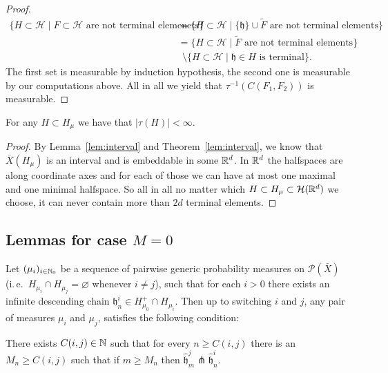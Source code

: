 \begin{proof}
  \begin{align*}
    \{H \subset \mathcal{H} \mid F \subset \mathcal{H} \text{ are not terminal elemenets}\}
    & = \{H \subset \mathcal{H} \mid \{\mathfrak{h}\} \cup \tilde F \text{ are not terminal elements}\}\\
    & = \{H \subset \mathcal{H} \mid \tilde{F} \text{ are not terminal elements}\} \\
    & \ \ \setminus \{H \subset \mathcal{H} \mid \mathfrak{h} \in H \text{ is terminal}\}.
  \end{align*}
  The first set is measurable by induction hypothesis, the second one is measurable by our computations above. All in all we yield that \(\tau^{-1}(C(F_1, F_2))\) is measurable.
\end{proof}

\begin{lemma}
  \label{lem:finite-terminal}
  For any \(H \subset H_\mu\) we have that \(|\tau(H)| < \infty\).
\end{lemma}

\begin{proof}
  By Lemma~\ref{lem:interval} and Theorem~\ref{lem:interval}, we know that \(\bar X(H_\mu)\) is an interval and is embeddable in some \(\mathbb{R}^d\). In \(\mathbb{R}^d\) the halfspaces are along coordinate axes and for each of those we can have at most one maximal and one minimal halfspace. So all in all no matter which \(H \subset H_\mu \subset \mathcal{H}(\mathbb{R}^d)\) we choose, it can never contain more than \(2d\) terminal elements.
\end{proof}

\subsection{Lemmas for case \(M=0\)}
\label{sec:M=0}

\begin{lemma}[{\cite[Lemma~4.13]{MR3509968}}]
  \label{lem:4.13}
  Let \((\mu_i)_{i \in \mathbb{N}_0}\) be a sequence of pairwise generic probability measures on \(\mathcal{P}(\bar X)\) (i.\,e.\ \(H_{\mu_i} \cap H_{\mu_j} = \varnothing\) whenever \(i \neq j\)), such that for each \(i > 0\) there exists an infinite descending chain \(\mathfrak{h}_n^i \in H_{\mu_0}^+ \cap H_{\mu_i}\). Then up to switching \(i\) and \(j\), any pair of measures \(\mu_i\) and \(\mu_j\), satisfies the following condition:

  There exists \(C(i,j) \in \mathbb{N}\) such that for every \(n \geq C(i,j)\) there is an \(M_n \geq C(i,j)\) such that if \(m \geq M_n\) then \(\mathfrak{\hat h}^j_m \pitchfork \mathfrak{\hat h}^i_n\). 
\end{lemma}

